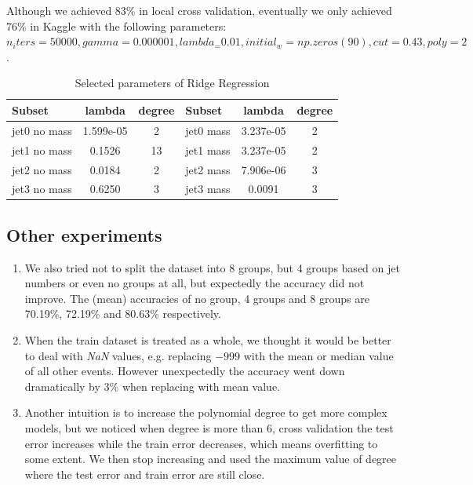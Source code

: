 \documentclass[10pt,conference,compsocconf]{IEEEtran}
\begin{document}
Although we achieved 83\% in local cross validation, eventually we only achieved 76\% in Kaggle with the following parameters: $n_iters = 50000, gamma = 0.000001, lambda_ = 0.01, initial_w = np.zeros(90), cut = 0.43, poly = 2$.

\begin{table}[htbp]
  \centering
  \begin{tabular}[c]{| l | c | c || l | c | c |}
    \hline
    Subset       & lambda & degree & Subset     & lambda      & degree \\
    \hline
    \hline 
    jet0 no mass & 1.599e-05  & 2  & jet0 mass  & 3.237e-05  & 2  \\
    jet1 no mass & 0.1526     & 13 & jet1 mass  & 3.237e-05  & 2  \\
    jet2 no mass & 0.0184     & 2  & jet2 mass  & 7.906e-06  & 3  \\
    jet3 no mass & 0.6250     & 3  & jet3 mass  & 0.0091     & 3  \\
    \hline
  \end{tabular}
  \caption{Selected parameters of Ridge Regression}
  \label{tab:param}
\end{table}

\subsection{Other experiments}
\begin{enumerate}
\item We also tried not to split the dataset into 8 groups, but 4 groups based on jet numbers or even no groups at all, but expectedly the accuracy did not improve. The (mean) accuracies of no group, 4 groups and 8 groups are 70.19\%, 72.19\% and 80.63\% respectively.
\item When the train dataset is treated as a whole, we thought it would be better to deal with \textit{NaN} values, e.g. replacing $-999$ with the mean or median value of all other events. However unexpectedly the accuracy went down dramatically by 3\% when replacing with mean value.
\item Another intuition is to increase the polynomial degree to get more complex models, but we noticed when degree is more than 6, cross validation the test error increases while the train error decreases, which means overfitting to some extent. We then stop increasing and used the maximum value of degree where the test error and train error are still close. 
\end{enumerate}
\end{document}
